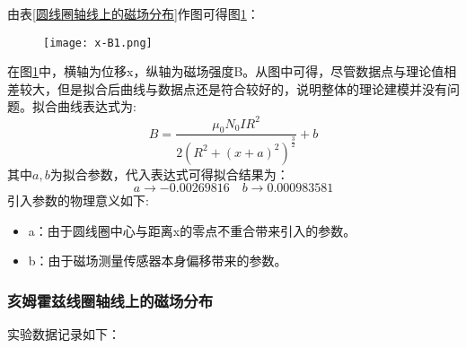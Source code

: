 \documentclass[11pt]{article}
\begin{document}
	\begin{table}[H]\centering
		\caption{圆线圈轴线上的磁场分布}
		\label{圆线圈轴线上的磁场分布}
	\end{table}
	由表\ref{圆线圈轴线上的磁场分布}作图可得图\ref{fig:x-B1}：
	\begin{figure}[H]
		\centering
		\texttt{[image: x-B1.png]}
		\caption{}
		\label{fig:x-B1}
	\end{figure}
	在图\ref{fig:x-B1}中，横轴为位移x，纵轴为磁场强度B。从图中可得，尽管数据点与理论值相差较大，但是拟合后曲线与数据点还是符合较好的，说明整体的理论建模并没有问题。拟合曲线表达式为:
	\[B=\frac{\mu_0N_0IR^2}{2(R^2+(x+a)^2)^{\frac{3}{2}}}+b  \]
	其中$a,b$为拟合参数，代入表达式可得拟合结果为：
	\[{a \rightarrow -0.00269816}\quad {b \rightarrow 0.000983581}\]
	引入参数的物理意义如下:
	\begin{itemize}
		\item a：由于圆线圈中心与距离x的零点不重合带来引入的参数。
		\item b：由于磁场测量传感器本身偏移带来的参数。
	\end{itemize}
	
	\subsubsection{亥姆霍兹线圈轴线上的磁场分布}
	实验数据记录如下：
	
\end{document}
